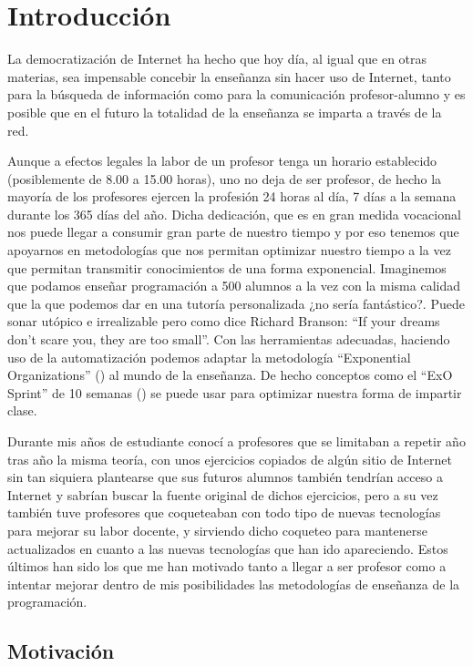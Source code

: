 \chapter{Introducción}

La democratización de Internet ha hecho que hoy día, al igual que en otras materias, sea impensable concebir la enseñanza sin hacer uso de Internet, tanto para la búsqueda de información como para la comunicación profesor-alumno y es posible que en el futuro la totalidad de la enseñanza se imparta a través de la red.

\bigskip
Aunque a efectos legales la labor de un profesor tenga un horario establecido (posiblemente de 8.00 a 15.00 horas), uno no deja de ser profesor, de hecho la mayoría de los profesores ejercen la profesión 24 horas al día, 7 días a la semana durante los 365 días del año. Dicha dedicación, que es en gran medida vocacional nos puede llegar a consumir gran parte de nuestro tiempo y por eso tenemos que apoyarnos en metodologías que nos permitan optimizar nuestro tiempo a la vez que permitan transmitir conocimientos de una forma exponencial. Imaginemos que podamos enseñar programación a 500 alumnos a la vez con la misma calidad que la que podemos dar en una tutoría personalizada ¿no sería fantástico?. Puede sonar utópico e irrealizable pero como dice Richard Branson: ``If your dreams don’t scare you, they are too small''. Con las herramientas adecuadas, haciendo uso de la automatización podemos adaptar la metodología ``Exponential Organizations'' (\cite{ismail_exponential_2014}) al mundo de la enseñanza. De hecho conceptos como el ``ExO Sprint'' de 10 semanas (\cite{ismail_exponential_2018}) se puede usar para optimizar nuestra forma de impartir clase.

\bigskip
Durante mis años de estudiante conocí a profesores que se limitaban a repetir año tras año la misma teoría, con unos ejercicios copiados de algún sitio de Internet sin tan siquiera plantearse que sus futuros alumnos también tendrían acceso a Internet y sabrían buscar la fuente original de dichos ejercicios, pero a su vez también tuve profesores que coqueteaban con todo tipo de nuevas tecnologías para mejorar su labor docente, y sirviendo dicho coqueteo para mantenerse actualizados en cuanto a las nuevas tecnologías que han ido apareciendo. Estos últimos han sido los que me han motivado tanto a llegar a ser profesor como a intentar mejorar dentro de mis posibilidades las metodologías de enseñanza de la programación.


\section{Motivación}

